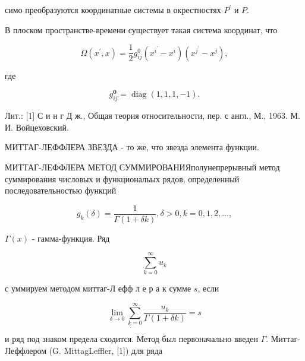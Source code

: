 \documentclass[10pt]{article}
\begin{document}
симо преобразуются координатные системы в окрестностях $P^{\prime}$ и $P$.



В плоском пространстве-времени существует такая система координат, что



\[

\Omega\left(x^{\prime}, x\right)=\frac{1}{2} g_{i j}^{0}\left(x^{i^{\prime}}-x^{i}\right)\left(x^{j^{\prime}}-x^{j}\right),

\]



где



\[

g_{i j}^{\mathbf{0}}=\operatorname{diag}(1,1,1,-1) .

\]



Лит.: [1] С и н г Д ж., Общая теория относительности, пер. с англ., М., 1963. М. И. Войцеховский.



МИТТАГ-ЛЕФФЛЕРА ЗВЕЗДА - то же, что звезда элемента функции.



МИТТАГ-ЛЕФФЛЕРА МЕТОД СУММИРОВАНИЯполунепрерывный метод суммирования числовых и функциональых рядов, определенный последовательностью функций



\[

g_{k}(\delta)=\frac{1}{\Gamma(1+\delta k)}, \delta>0, k=0,1,2, \ldots,

\]



$\Gamma(x)$ - гамма-функция. Ряд



\[

\sum_{k=0}^{\infty} u_{k}

\]



с уммируем методом миттаг-Л ефф л е р а к сумме $s$, если



\[

\lim _{\delta \rightarrow 0} \sum_{k=0}^{\infty} \frac{u_{k}}{\Gamma(1+\delta k)}=s

\]



и ряд под знаком предела сходится. Метод был первоначально введен $\Gamma$. Миттаг-ЈІеффлером (G. MittagLeffler, [1]) для ряда
\end{document}
